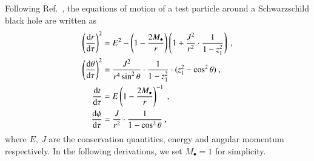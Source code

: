 \documentclass[aps,prx,reprint,superscriptaddress,nofootinbib,longbibliography]{revtex4-1}
\begin{document}
Following Ref.~\cite{Fujita_2009}, the equations of motion of a test particle around a Schwarzschild black hole are written as 
\begin{equation}
\begin{aligned}
    \left(\dv{r}{\tau}\right)^{2}&=E^{2}-\left(1-\frac{2M_{\bullet}}{r}\right)\left(1+\frac{J^{2}}{r^{2}}\cdot\frac{1}{1-z_{1}^{2}}\right)\ , \\
    \left(\dv{\theta}{\tau}\right)^{2}&=\frac{J^{2}}{r^{4}\sin^{2}\theta}\cdot\frac{1}{1-z_{1}^{2}}\cdot(z_{1}^{2}-\cos^{2}\theta)\ , \\ 
     \dv{t}{\tau}&=E\left(1-\frac{2M_{\bullet}}{r}\right)^{-1}\ ,\\
      \dv{\phi}{\tau}&=\frac{J}{r^{2}}\cdot\frac{1}{1-\cos^{2}\theta}\ ,
\end{aligned}
\label{eq:four equations of motion}
\end{equation}
where $E,\ J$ are the conservation quantities, energy and angular momentum respectively. In the following derivations, we set $M_{\bullet}=1$ for simplicity.
\end{document}
